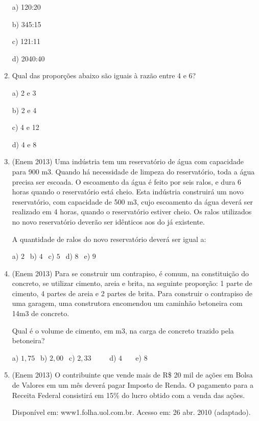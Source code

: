 \begin{multicols*}{2}
\begin{enumerate}
		      a) 120:20

		      b) 345:15

		      c) 121:11

		      d) 2040:40\\

		\item Qual das proporções abaixo são iguais à razão entre 4 e 6?

		      a) 2 e 3

		      b) 2 e 4

		      c) 4 e 12

		      d) 4 e 8\\

		\item (Enem 2013) Uma indústria tem um reservatório de água com capacidade para 900 m3. Quando há necessidade de limpeza do reservatório, toda a água precisa ser escoada. O escoamento da água é feito por seis ralos, e dura 6 horas quando o reservatório está cheio. Esta indústria construirá um novo reservatório, com capacidade de 500 m3, cujo escoamento da água deverá ser realizado em 4 horas, quando o reservatório estiver cheio. Os ralos utilizados no
		      novo reservatório deverão ser idênticos aos do já existente.

		      A quantidade de ralos do novo reservatório deverá ser igual a:

		      a) $2 \ \ $ b) $4 \ \ $ c) $5 \ \ $ d) $8 \ \ $ e) $9 \ \ $

		\item (Enem 2013) Para se construir um contrapiso, é comum, na constituição do concreto, se utilizar cimento, areia e brita, na seguinte proporção: 1 parte de cimento, 4 partes de areia e 2 partes de brita. Para construir o contrapiso de uma
		      garagem, uma construtora encomendou um caminhão betoneira com 14m3 de concreto.

		      Qual é o volume de cimento, em m3, na carga de concreto trazido pela betoneira?

		      a) $1,75 \ \ $ b) $2,00 \ \ $ c) $2,33 \ \ \ \ \ \ \ \ \ \ $ d) $4 \ \ \ \ \ \ \ $ e) $8 \ \ $

		\item (Enem 2013) O contribuinte que vende mais de R\$ 20 mil de ações em Bolsa de Valores em um mês deverá pagar Imposto de Renda. O pagamento para a Receita Federal consistirá em 15\% do lucro obtido com a venda das ações.

		      Disponível em: www1.folha.uol.com.br. Acesso em: 26
		      abr. 2010 (adaptado).


\end{enumerate}
\end{multicols*}

